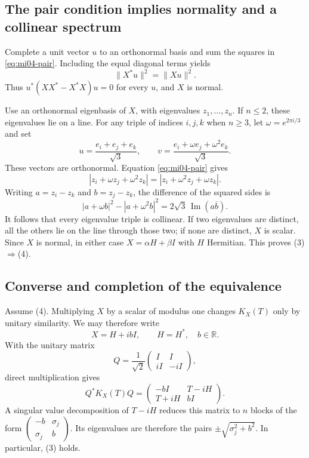 \documentclass[10pt,a4paper]{article}
\theoremstyle{remark}
\newcommand{\R}{\mathbb R}
\begin{document}
\subsection{The pair condition implies normality and a collinear spectrum}

Complete a unit vector $u$ to an orthonormal basis and sum the squares in \eqref{eq:mi04-pair}. Including the equal diagonal terms yields
\[
 \|X^*u\|^2=\|Xu\|^2.
\]
Thus $u^*(XX^*-X^*X)u=0$ for every $u$, and $X$ is normal.

Use an orthonormal eigenbasis of $X$, with eigenvalues $z_1,\ldots,z_n$. If $n\leq2$, these eigenvalues lie on a line. For any triple of indices $i,j,k$ when $n\geq3$, let $\omega=e^{2\pi i/3}$ and set
\[
 u=\frac{e_i+e_j+e_k}{\sqrt3},\qquad
 v=\frac{e_i+\omega e_j+\omega^2e_k}{\sqrt3}.
\]
These vectors are orthonormal. Equation \eqref{eq:mi04-pair} gives
\[
 |z_i+\omega z_j+\omega^2z_k|
 =|z_i+\omega^2z_j+\omega z_k|.
\]
Writing $a=z_i-z_k$ and $b=z_j-z_k$, the difference of the squared sides is
\[
 |a+\omega b|^2-|a+\omega^2b|^2
 =2\sqrt3\,\operatorname{Im}(a\overline b).
\]
It follows that every eigenvalue triple is collinear. If two eigenvalues are distinct, all the others lie on the line through those two; if none are distinct, $X$ is scalar. Since $X$ is normal, in either case $X=\alpha H+\beta I$ with $H$ Hermitian. This proves (3)$\Rightarrow$(4).

\subsection{Converse and completion of the equivalence}

Assume (4). Multiplying $X$ by a scalar of modulus one changes $K_X(T)$ only by unitary similarity. We may therefore write
\[
 X=H+ibI,\qquad H=H^*,\quad b\in\R.
\]
With the unitary matrix
\[
 Q=\frac1{\sqrt2}\begin{pmatrix}I&I\\ iI&-iI\end{pmatrix},
\]
direct multiplication gives
\[
 Q^*K_X(T)Q
 =\begin{pmatrix}-bI&T-iH\\T+iH&bI\end{pmatrix}.
\]
A singular value decomposition of $T-iH$ reduces this matrix to $n$ blocks of the form
$\begin{pmatrix}-b&\sigma_j\\\sigma_j&b\end{pmatrix}$.
Its eigenvalues are therefore the pairs
$\pm\sqrt{\sigma_j^2+b^2}$. In particular, (3) holds.
\end{document}
